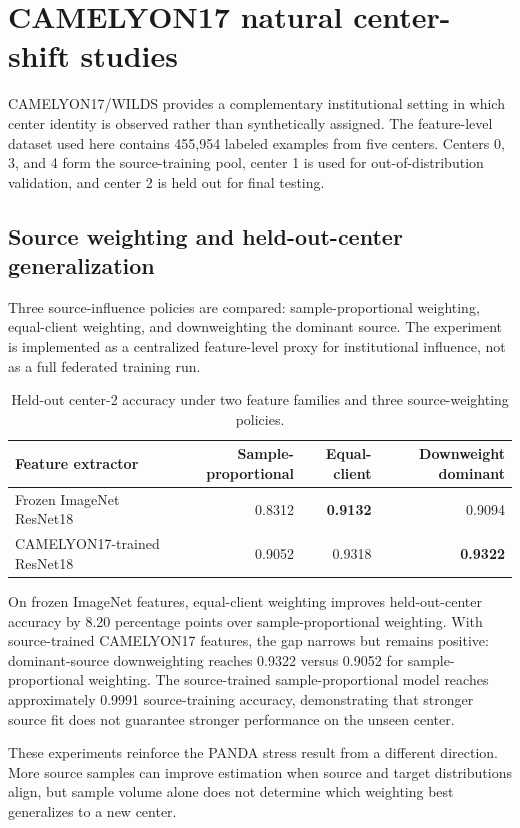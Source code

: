 \section{CAMELYON17 natural center-shift studies}

CAMELYON17/WILDS \cite{bandi2018camelyon17,koh2021wilds} provides a complementary institutional setting in which center identity is observed rather than synthetically assigned. The feature-level dataset used here contains 455,954 labeled examples from five centers. Centers 0, 3, and 4 form the source-training pool, center 1 is used for out-of-distribution validation, and center 2 is held out for final testing.

\subsection{Source weighting and held-out-center generalization}
Three source-influence policies are compared: sample-proportional weighting, equal-client weighting, and downweighting the dominant source. The experiment is implemented as a centralized feature-level proxy for institutional influence, not as a full federated training run.

\begin{table}[t]
\centering
\caption{Held-out center-2 accuracy under two feature families and three source-weighting policies.}
\label{tab:camelyon_weighting}
\small
\begin{tabular}{lrrr}
\toprule
Feature extractor & Sample-proportional & Equal-client & Downweight dominant \\
\midrule
Frozen ImageNet ResNet18 & 0.8312 & \textbf{0.9132} & 0.9094 \\
CAMELYON17-trained ResNet18 & 0.9052 & 0.9318 & \textbf{0.9322} \\
\bottomrule
\end{tabular}
\end{table}

On frozen ImageNet features, equal-client weighting improves held-out-center accuracy by 8.20 percentage points over sample-proportional weighting. With source-trained CAMELYON17 features, the gap narrows but remains positive: dominant-source downweighting reaches 0.9322 versus 0.9052 for sample-proportional weighting. The source-trained sample-proportional model reaches approximately 0.9991 source-training accuracy, demonstrating that stronger source fit does not guarantee stronger performance on the unseen center.

These experiments reinforce the PANDA stress result from a different direction. More source samples can improve estimation when source and target distributions align, but sample volume alone does not determine which weighting best generalizes to a new center.


